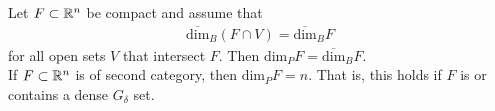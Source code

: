\documentclass{memoir}
\begin{document}
\begin{cor}
	Let \(F\subset \mathbb{R}^{n}\) be compact and assume that
	\begin{align*}
		\overline{\textrm{dim}}_B(F\cap V) = \overline{\textrm{dim}}_B F
	\end{align*}
	for all open sets \(V\) that intersect \(F\). Then \(\textrm{dim}_P F = \overline{\textrm{dim}}_BF\).\\

	If \(F\subset \mathbb{R}^{n}\) is of second category, then \(\textrm{dim}_P F = n\). That is, this holds if \(F\) is or contains a dense \(G_\delta\) set.
\end{cor}



\end{document}
